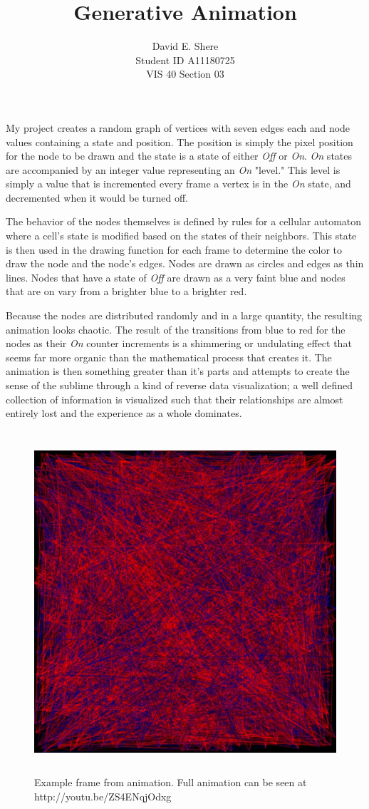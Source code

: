 \documentclass{article}
\begin{document}
\title{Generative Animation}
\author{David E. Shere\\Student ID A11180725\\VIS 40 Section 03}
\maketitle

My project creates a random graph of vertices with seven edges each
and node values containing a state and position.
The position is simply the pixel position for the node to be drawn
and the state is a state of either \emph{Off} or \emph{On}.  \emph{On} states are
accompanied by an integer value representing an \emph{On} "level."
This level is simply a value that is incremented every frame a
vertex is in the \emph{On} state, and decremented when it would be turned off.

The behavior of the nodes themselves is defined by rules for a cellular
automaton where a cell's state is modified based on the states of
their neighbors.  This state
is then used in the drawing function for each frame to determine the
color to draw the node and the node's edges.  Nodes are drawn as circles
and edges as thin lines.  Nodes that have a state of \emph{Off} are drawn
as a very faint blue and nodes that are on vary from a brighter blue to
a brighter red.

Because the nodes are distributed randomly and in a large quantity, the
resulting animation looks chaotic.  The result of the transitions
from blue to red for the nodes as their \emph{On} counter increments is
a shimmering or undulating effect that seems far more organic than
the mathematical process that creates it.
The animation is then something greater than it's parts
and attempts to create the sense of the sublime through a kind of
reverse data visualization; a well defined
collection of information is visualized such that their relationships
are almost entirely lost and the experience as a whole dominates.

\begin{figure}
\includegraphics[height=5in]{frame.png}
\caption{Example frame from animation.
Full animation can be seen at http://youtu.be/ZS4ENqjOdxg}
\end{figure}

\newpage

\end{document}
